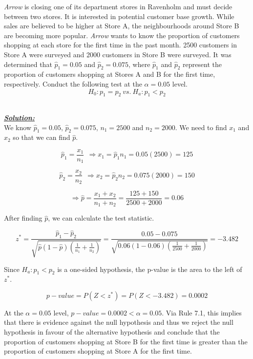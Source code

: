 \begin{example}
\textit{Arrow} is closing one of its department stores in Ravenholm and must decide between two stores. It is interested in potential customer base growth. While sales are believed to be higher at Store A, the neighbourhoods around Store B are becoming more popular. \textit{Arrow} wants to know the proportion of customers shopping at each store for the first time in the past month. 2500 customers in Store A were surveyed and 2000 customers in Store B were surveyed. It was determined that $\hat{p}_1=0.05$ and $\hat{p}_2=0.075$, where $\hat{p}_1$ and $\hat{p}_2$ represent the proportion of customers shopping at Stores A and B for the first time, respectively. Conduct the following test at the $\alpha=0.05$ level. 
\[ H_0 : p_1 = p_2 ~vs.~ H_a : p_1 < p_2 \]

\hfill\\
{\emph{\textbf{\underline{Solution:}}}}\\

We know $\hat{p}_1=0.05$, $\hat{p}_2=0.075$, $n_1 = 2500$ and $n_2=2000$. We need to find $x_1$ and $x_2$ so that we can find $\hat{p}$. 

\[ \hat{p}_1 = \frac{x_1}{n_1} \>\> \Rightarrow x_1 = \hat{p}_1 n_1 = 0.05 (2500) = 125 \]

\[ \hat{p}_2 = \frac{x_2}{n_2} \>\> \Rightarrow x_2 = \hat{p}_2 n_2 = 0.075(2000) = 150 \]

\[ \Rightarrow \hat{p} = \frac{x_1+x_2}{n_1+n_2} = \frac{125+150}{2500+2000}=0.06 \]

After finding $\hat{p}$, we can calculate the test statistic. 

\[ z^{*} = \frac{\hat{p}_1 - \hat{p}_2}{\sqrt{\hat{p}(1-\hat{p}) \left( \frac{1}{n_1} + \frac{1}{n_2} \right) }} = \frac{0.05-0.075}{\sqrt{0.06(1-0.06) \left(\frac{1}{2500}+\frac{1}{2000}\right)}}=-3.482\]

Since $H_a: p_1 < p_2$ is a one-sided hypothesis, the p-value is the area to the left of $z^{*}$. 

\[ p-value = P(Z < z^{*}) = P(Z < -3.482) = 0.0002\]

At the $\alpha=0.05$ level, $p-value = 0.0002 < \alpha = 0.05$. Via Rule 7.1, this implies that there is evidence against the null hypothesis and thus we reject the null hypothesis in favour of the alternative hypothesis and conclude that the proportion of customers shopping at Store B for the first time is greater than the proportion of customers shopping at Store A for the first time. 
\end{example}




